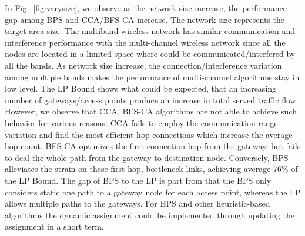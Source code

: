 In Fig.~\ref{fig:varysize}, we observe as the network size increase, the performance
gap among BPS and CCA/BFS-CA increase. The network size represents the target area size. 
The multiband wireless network has similar communication and interference performance with 
the multi-channel wireless network since all the nodes are located in a limited space where 
could be communicated/interfered by all the bands. 
As network size increase, the connection/interference variation among multiple bands makes 
the performance of multi-channel algorithms stay in low level. The LP Bound shows what 
could be expected, that an increasing number of gateways/access points produce an increase in 
total served traffic flow. However, we observe that CCA, BFS-CA algorithms are not able 
to achieve such behavior for various reasons. CCA fails to employ the communication range 
variation and find the most efficient hop connections which increase the average hop count. 
BFS-CA optimizes the first connection hop from the gateway, but fails to deal the whole path 
from the gateway to destination node. Conversely, BPS alleviates the strain on these first-hop, 
bottleneck links, achieving average 76\% of the LP Bound. The gap of BPS to the LP is part from 
that the BPS only considers static one path to a gateway node for each access point, whereas the 
LP allows multiple paths to the gateways. For BPS and other heuristic-based algorithms the dynamic 
assignment could be implemented through updating the assignment in a short term.

